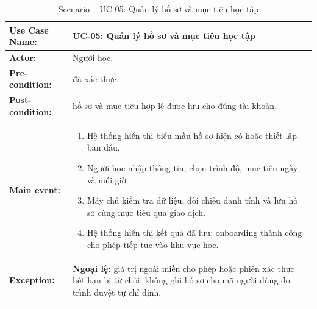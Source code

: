 \documentclass[12pt,a4paper,oneside]{report}
\newenvironment{luongusecase}{%
    \begin{enumerate}[leftmargin=1.6em,topsep=0pt,itemsep=0.25em,parsep=0pt]
}{\end{enumerate}}
\begin{document}
\begingroup
\renewcommand{\arraystretch}{1.15}
\setlength{\LTpre}{0.4em}
\setlength{\LTpost}{0.6em}
\begin{longtable}{|>{\raggedright\arraybackslash\bfseries}p{}|p{}|}
\hline
Use Case Name: & UC-05: Quản lý hồ sơ và mục tiêu học tập \\
\hline
Actor: & Người học. \\
\hline
Pre-condition: & đã xác thực. \\
\hline
Post-condition: & hồ sơ và mục tiêu hợp lệ được lưu cho đúng tài khoản. \\
\hline
Main event: & \begin{luongusecase}
\item Hệ thống hiển thị biểu mẫu hồ sơ hiện có hoặc thiết lập ban đầu.
    \item Người học nhập thông tin, chọn trình độ, mục tiêu ngày và múi giờ.
    \item Máy chủ kiểm tra dữ liệu, đối chiếu danh tính và lưu hồ sơ cùng mục tiêu qua giao dịch.
    \item Hệ thống hiển thị kết quả đã lưu; onboarding thành công cho phép tiếp tục vào khu vực học.
\end{luongusecase} \\
\hline
Exception: & \textbf{Ngoại lệ:} giá trị ngoài miền cho phép hoặc phiên xác thực hết hạn bị từ chối; không ghi hồ sơ cho mã người dùng do trình duyệt tự chỉ định. \\
\hline
\caption{Scenario -- UC-05: Quản lý hồ sơ và mục tiêu học tập}\label{tab:uc-05}\\
\end{longtable}
\endgroup
\end{document}
